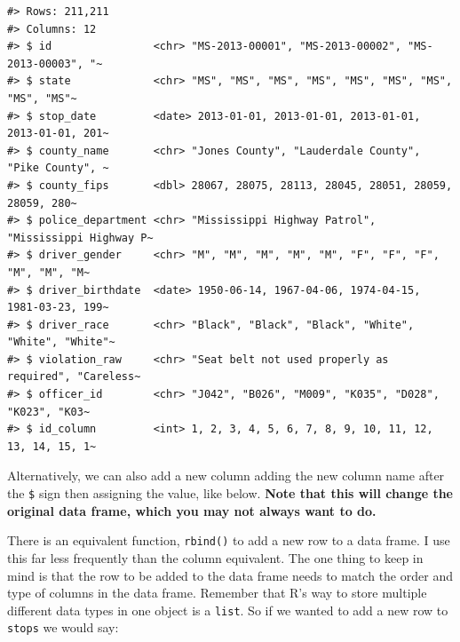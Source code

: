 \documentclass[
]{book}
\newenvironment{Shaded}{\begin{snugshade}}{\end{snugshade}}
\newcommand{\CommentTok}[1]{\textcolor[rgb]{0.56,0.35,0.01}{\textit{#1}}}
\newcommand{\ConstantTok}[1]{\textcolor[rgb]{0.56,0.35,0.01}{#1}}
\newcommand{\DecValTok}[1]{\textcolor[rgb]{0.00,0.00,0.81}{#1}}
\newcommand{\FunctionTok}[1]{\textcolor[rgb]{0.13,0.29,0.53}{\textbf{#1}}}
\newcommand{\NormalTok}[1]{#1}
\newcommand{\OtherTok}[1]{\textcolor[rgb]{0.56,0.35,0.01}{#1}}
\newcommand{\SpecialCharTok}[1]{\textcolor[rgb]{0.81,0.36,0.00}{\textbf{#1}}}
\begin{document}
\begin{verbatim}
#> Rows: 211,211
#> Columns: 12
#> $ id                <chr> "MS-2013-00001", "MS-2013-00002", "MS-2013-00003", "~
#> $ state             <chr> "MS", "MS", "MS", "MS", "MS", "MS", "MS", "MS", "MS"~
#> $ stop_date         <date> 2013-01-01, 2013-01-01, 2013-01-01, 2013-01-01, 201~
#> $ county_name       <chr> "Jones County", "Lauderdale County", "Pike County", ~
#> $ county_fips       <dbl> 28067, 28075, 28113, 28045, 28051, 28059, 28059, 280~
#> $ police_department <chr> "Mississippi Highway Patrol", "Mississippi Highway P~
#> $ driver_gender     <chr> "M", "M", "M", "M", "M", "F", "F", "F", "M", "M", "M~
#> $ driver_birthdate  <date> 1950-06-14, 1967-04-06, 1974-04-15, 1981-03-23, 199~
#> $ driver_race       <chr> "Black", "Black", "Black", "White", "White", "White"~
#> $ violation_raw     <chr> "Seat belt not used properly as required", "Careless~
#> $ officer_id        <chr> "J042", "B026", "M009", "K035", "D028", "K023", "K03~
#> $ id_column         <int> 1, 2, 3, 4, 5, 6, 7, 8, 9, 10, 11, 12, 13, 14, 15, 1~
\end{verbatim}

Alternatively, we can also add a new column adding the new column name after the \texttt{\$} sign then assigning the value, like below. \textbf{Note that this will change the original data frame, which you may not always want to do.}

\begin{Shaded}
\end{Shaded}

There is an equivalent function, \texttt{rbind()} to add a new row to a data frame. I use this far less frequently than the column equivalent. The one thing to keep in mind is that the row to be added to the data frame needs to match the order and type of columns in the data frame. Remember that R's way to store multiple different data types in one object is a \texttt{list}. So if we wanted to add a new row to \texttt{stops} we would say:
\end{document}
